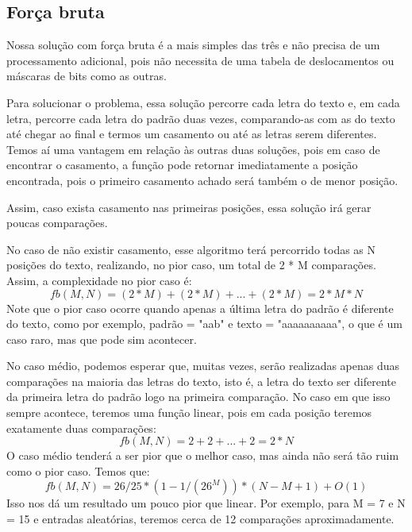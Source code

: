 \documentclass[12pt]{article}
\begin{document}
        \subsection{Força bruta}
            Nossa solução com força bruta é a mais simples das três e não precisa de um processamento adicional, pois não necessita de 
            uma tabela de deslocamentos ou máscaras de bits como as outras.

            Para solucionar o problema, essa solução percorre cada letra do texto e, em cada letra, percorre cada letra do padrão duas 
            vezes, comparando-as com as do texto até chegar ao final e termos um casamento ou até as letras serem diferentes. Temos aí 
            uma vantagem em relação às outras duas soluções, pois em caso de encontrar o casamento, a função pode retornar imediatamente 
            a posição encontrada, pois o primeiro casamento achado será também o de menor posição.
            
            Assim, caso exista casamento nas primeiras posições, essa solução irá gerar poucas comparações.
            
            No caso de não existir casamento, esse algoritmo terá percorrido todas as N posições do texto, realizando, no pior caso, 
            um total de 2 * M comparações. Assim, a complexidade no pior caso é:
                \begin{displaymath}
                    fb(M, N) = (2 * M) + (2 * M) + ... + (2 * M) = 2 * M * N
                \end{displaymath}
            Note que o pior caso ocorre quando apenas a última letra do padrão é diferente do texto, como por exemplo, padrão = "aab" 
            e texto = "aaaaaaaaaa", o que é um caso raro, mas que pode sim acontecer.
            
            No caso médio, podemos esperar que, muitas vezes, serão realizadas apenas duas comparações na maioria das letras do texto, 
            isto é, a letra do texto ser diferente da primeira letra do padrão logo na primeira comparação. No caso em que isso sempre 
            acontece, teremos uma função linear, pois em cada posição teremos exatamente duas comparações:
                \begin{displaymath}
                    fb(M, N) = 2 + 2 + ... + 2 = 2 * N
                \end{displaymath}
            O caso médio tenderá a ser pior que o melhor caso, mas ainda não será tão ruim como o pior caso. Temos que:
                \begin{displaymath}
                    fb(M, N) = 26/25 * (1 - 1/(26^M)) * (N - M + 1) + O(1)
                \end{displaymath}
            Isso nos dá um resultado um pouco pior que linear. Por exemplo, para M = 7 e N = 15 e entradas aleatórias, teremos cerca de 
            12 comparações aproximadamente.
\end{document}

